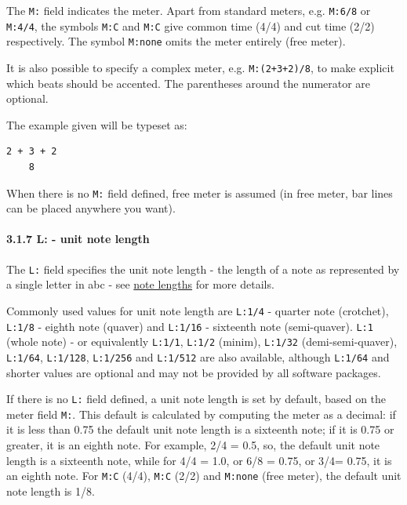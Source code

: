 \documentclass[oneside]{book}
\let\oldparagraph\paragraph
\renewcommand{\paragraph}[1]{\oldparagraph{#1}\mbox{}}
\begin{document}
The \texttt{M:} field indicates the meter. Apart from standard meters,
e.g. \texttt{M:6/8} or \texttt{M:4/4}, the symbols \texttt{M:C} and
\texttt{M:C\textbar{}} give common time (4/4) and cut time (2/2)
respectively. The symbol \texttt{M:none} omits the meter entirely (free
meter).

It is also possible to specify a complex meter, e.g.
\texttt{M:(2+3+2)/8}, to make explicit which beats should be accented.
The parentheses around the numerator are optional.

The example given will be typeset as:

\begin{verbatim}
2 + 3 + 2
    8
\end{verbatim}

When there is no \texttt{M:} field defined, free meter is assumed (in
free meter, bar lines can be placed anywhere you want).

\hypertarget{lunit_note_length}{\paragraph{3.1.7 L: - unit note
length}\label{lunit_note_length}}

The \texttt{L:} field specifies the unit note length - the length of a
note as represented by a single letter in abc - see
\protect\hyperlink{note_lengths}{note lengths} for more details.

Commonly used values for unit note length are \texttt{L:1/4} - quarter
note (crotchet), \texttt{L:1/8} - eighth note (quaver) and
\texttt{L:1/16} - sixteenth note (semi-quaver). \texttt{L:1} (whole
note) - or equivalently \texttt{L:1/1}, \texttt{L:1/2} (minim),
\texttt{L:1/32} (demi-semi-quaver), \texttt{L:1/64}, \texttt{L:1/128},
\texttt{L:1/256} and \texttt{L:1/512} are also available, although
\texttt{L:1/64} and shorter values are optional and may not be provided
by all software packages.

If there is no \texttt{L:} field defined, a unit note length is set by
default, based on the meter field \texttt{M:}. This default is
calculated by computing the meter as a decimal: if it is less than 0.75
the default unit note length is a sixteenth note; if it is 0.75 or
greater, it is an eighth note. For example, 2/4 = 0.5, so, the default
unit note length is a sixteenth note, while for 4/4 = 1.0, or 6/8 =
0.75, or 3/4= 0.75, it is an eighth note. For \texttt{M:C} (4/4),
\texttt{M:C\textbar{}} (2/2) and \texttt{M:none} (free meter), the
default unit note length is 1/8.
\end{document}

